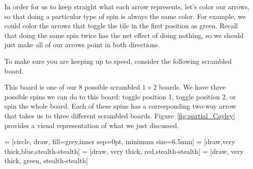 In order for us to keep straight what each arrow represents, let's color our arrows, so that doing a particular type of spin is always the same color.  For example, we could color the arrows that toggle the tile in the first position as green.  Recall that doing the same spin twice has the net effect of doing nothing, so we should just make all of our arrows point in both directions.

To make sure you are keeping up to speed, consider the following scrambled board.

\begin{center}
\end{center}

\noindent This board is one of our 8 possible scrambled $1\times 2$ boards.  We have three possible spins we can do to this board: toggle position 1, toggle position 2, or spin the whole board.  Each of these spins has a corresponding two-way arrow that takes us to three different scrambled boards.  Figure~\ref{fig:partial_Cayley} provides a visual representation of what we just discussed.

 = [circle, draw, fill=grey,inner sep=0pt, minimum size=6.5mm]
 = [draw,very thick,blue,stealth-stealth]
 = [draw, very thick, red,stealth-stealth]
 = [draw, very thick, green, stealth-stealth]

